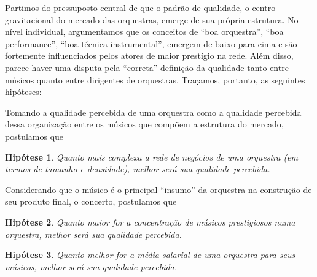 \documentclass[a4paper, 12pt, openright, oneside, german, french, english, brazil]{abntex2}
\begin{document}
	\newtheorem{hip}{Hipótese}

	
	Partimos do pressuposto central de que o padrão de qualidade, o centro gravitacional do mercado das orquestras, emerge de sua própria estrutura. No nível individual, argumentamos que os conceitos de ``boa orquestra'', ``boa performance'', ``boa técnica instrumental'', emergem de baixo para cima e são fortemente influenciados pelos atores de maior prestígio na rede. Além disso, parece haver uma disputa pela ``correta'' definição da qualidade tanto entre músicos quanto entre dirigentes de orquestras. Traçamos, portanto, as seguintes hipóteses:

        Tomando a qualidade percebida de uma orquestra como a qualidade percebida dessa organização entre os músicos que compõem a estrutura do mercado, postulamos que 
	

        \begin{hip}\label{hip:redecomplexa}
		Quanto mais complexa a rede de negócios de uma orquestra (em termos de tamanho e densidade), melhor será sua qualidade percebida.
	\end{hip}

        Considerando que o músico é o principal ``insumo'' da orquestra na construção de seu produto final, o concerto, postulamos que
        
	\begin{hip}\label{hip:musprest}
		Quanto maior for a concentração de músicos prestigiosos numa orquestra, melhor será sua qualidade percebida.
	\end{hip}
	

	
	\begin{hip}\label{hip:incentivos}
		Quanto melhor for a média salarial de uma orquestra para seus músicos, melhor será sua qualidade percebida.
              \end{hip}
\end{document}
